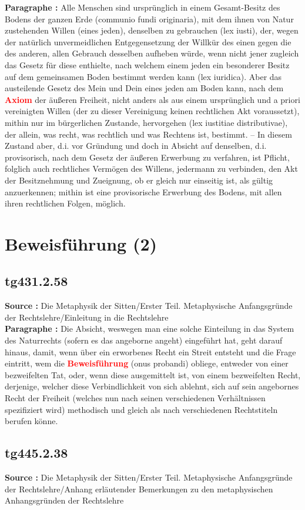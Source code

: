 \documentclass[a4paper,12pt,twoside]{book}
\newcommand{\match}[1]{\textcolor{red}{\textbf{#1}}}
\newcommand{\unnumberedsection}[1]{
	\section*{#1}
	\addcontentsline{toc}{section}{#1}
	\markright{#1}
}
\begin{document}
	\textbf{Paragraphe : }Alle Menschen sind ursprünglich in einem Gesamt-Besitz des Bodens der ganzen Erde (communio fundi originaria), mit dem ihnen von Natur zustehenden Willen (eines jeden), denselben zu gebrauchen (lex iusti), der, wegen der natürlich unvermeidlichen Entgegensetzung der Willkür des einen gegen die des anderen, allen Gebrauch desselben aufheben würde, wenn nicht jener zugleich das Gesetz für diese enthielte, nach welchem einem jeden ein besonderer Besitz auf dem gemeinsamen Boden bestimmt werden kann (lex iuridica). Aber das austeilende Gesetz des Mein und Dein eines jeden am Boden kann, nach dem \match{Axiom} der äußeren Freiheit, nicht anders als aus einem ursprünglich und a priori vereinigten Willen (der zu dieser Vereinigung keinen rechtlichen Akt voraussetzt), mithin nur im bürgerlichen Zustande, hervorgehen (lex iustitiae distributivae), der allein, was recht, was rechtlich und was Rechtens ist, bestimmt. – In diesem Zustand aber, d.i. vor Gründung und doch in Absicht auf denselben, d.i. provisorisch, nach dem Gesetz der äußeren Erwerbung zu verfahren, ist Pflicht, folglich auch rechtliches Vermögen des Willens, jedermann zu verbinden, den Akt der Besitznehmung und Zueignung, ob er gleich nur einseitig ist, als gültig anzuerkennen; mithin ist eine provisorische Erwerbung des Bodens, mit allen ihren rechtlichen Folgen, möglich. 
	
	\unnumberedsection{Beweisführung (2)} 
	\subsection*{tg431.2.58} 
	\textbf{Source : }Die Metaphysik der Sitten/Erster Teil. Metaphysische Anfangsgründe der Rechtslehre/Einleitung in die Rechtslehre\\  
	
	\textbf{Paragraphe : }Die Absicht, weswegen man eine solche Einteilung in das System des Naturrechts (sofern es das angeborne angeht) eingeführt hat, geht darauf hinaus, damit, wenn über ein erworbenes Recht ein Streit entsteht und die Frage eintritt, wem die \match{Beweisführung} (onus probandi) obliege, entweder von einer bezweifelten Tat, oder, wenn diese ausgemittelt ist, von einem bezweifelten Recht, derjenige, welcher diese Verbindlichkeit von sich ablehnt, sich auf sein angebornes Recht der Freiheit (welches nun nach seinen verschiedenen Verhältnissen spezifiziert wird) methodisch und gleich als nach verschiedenen Rechtstiteln berufen könne. 
	
	\subsection*{tg445.2.38} 
	\textbf{Source : }Die Metaphysik der Sitten/Erster Teil. Metaphysische Anfangsgründe der Rechtslehre/Anhang erläutender Bemerkungen zu den metaphysischen Anhangsgründen der Rechtslehre\\  
	
\end{document}
